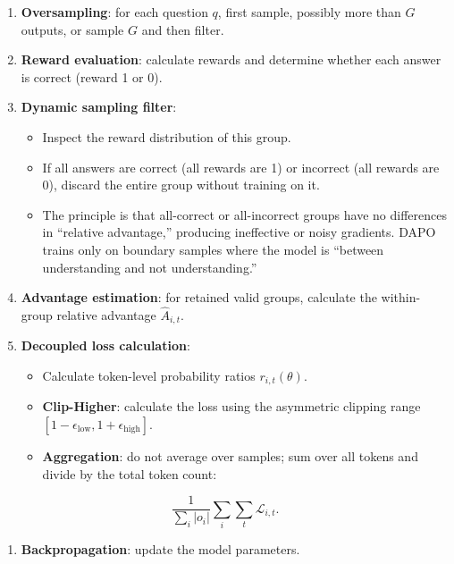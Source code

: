 \begin{enumerate}
\def\labelenumi{\arabic{enumi}.}
\tightlist
\item
  \textbf{Oversampling}: for each question \(q\), first sample, possibly more than \(G\) outputs, or sample \(G\) and then filter.
\item
  \textbf{Reward evaluation}: calculate rewards and determine whether each answer is correct (reward 1 or 0).
\item
{}
  \textbf{Dynamic sampling filter}:

  \begin{itemize}
  \tightlist
  \item
    Inspect the reward distribution of this group.
  \item
    If all answers are correct (all rewards are 1) or incorrect (all rewards are 0), discard the entire group without training on it.
  \item
    The principle is that all-correct or all-incorrect groups have no differences in ``relative advantage,'' producing ineffective or noisy gradients. DAPO trains only on boundary samples where the model is ``between understanding and not understanding.''
  \end{itemize}
\item
  \textbf{Advantage estimation}: for retained valid groups, calculate the within-group relative advantage \(\hat{A}_{i,t}\).
\item
{}
  \textbf{Decoupled loss calculation}:

  \begin{itemize}
  \tightlist
  \item
    Calculate token-level probability ratios \(r_{i,t}(\theta)\).
  \item
    \textbf{Clip-Higher}: calculate the loss using the asymmetric clipping range \([1-\epsilon_{\mathrm{low}},1+\epsilon_{\mathrm{high}}]\).
  \item
{}
    \textbf{Aggregation}: do not average over samples; sum over all tokens and divide by the total token count:
  \end{itemize}
\end{enumerate}

\[
\frac{1}{\sum_i |o_i|}
\sum_i \sum_t \mathcal{L}_{i,t}.
\]

\begin{enumerate}
\def\labelenumi{\arabic{enumi}.}
\setcounter{enumi}{5}
\tightlist
\item
  \textbf{Backpropagation}: update the model parameters.
\end{enumerate}

